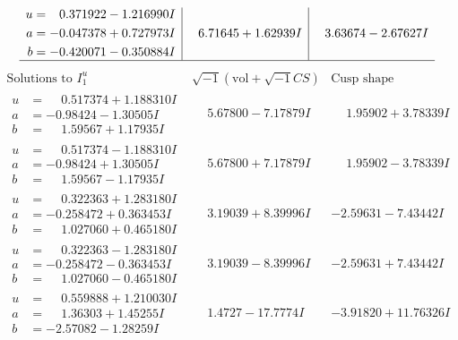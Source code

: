 \documentclass[1p]{elsarticle_modified}
\theoremstyle{definition}
\newcommand{\I}{\sqrt{-1}}
\begin{document}
$$\begin{array}{c|c|c}
\begin{aligned}
u &= \phantom{-}0.371922 - 1.216990 I \\
a &= -0.047378 + 0.727973 I \\
b &= -0.420071 - 0.350884 I\end{aligned}
 & \phantom{-}6.71645 + 1.62939 I & \phantom{-}3.63674 - 2.67627 I\\
 \hline 
 \end{array}$$\newpage$$\begin{array}{c|c|c}  
\text{Solutions to }I^u_{1}& \I (\text{vol} + \sqrt{-1}CS) & \text{Cusp shape}\\
 \hline 
\begin{aligned}
u &= \phantom{-}0.517374 + 1.188310 I \\
a &= -0.98424 - 1.30505 I \\
b &= \phantom{-}1.59567 + 1.17935 I\end{aligned}
 & \phantom{-}5.67800 - 7.17879 I & \phantom{-}1.95902 + 3.78339 I \\ \hline\begin{aligned}
u &= \phantom{-}0.517374 - 1.188310 I \\
a &= -0.98424 + 1.30505 I \\
b &= \phantom{-}1.59567 - 1.17935 I\end{aligned}
 & \phantom{-}5.67800 + 7.17879 I & \phantom{-}1.95902 - 3.78339 I \\ \hline\begin{aligned}
u &= \phantom{-}0.322363 + 1.283180 I \\
a &= -0.258472 + 0.363453 I \\
b &= \phantom{-}1.027060 + 0.465180 I\end{aligned}
 & \phantom{-}3.19039 + 8.39996 I & -2.59631 - 7.43442 I \\ \hline\begin{aligned}
u &= \phantom{-}0.322363 - 1.283180 I \\
a &= -0.258472 - 0.363453 I \\
b &= \phantom{-}1.027060 - 0.465180 I\end{aligned}
 & \phantom{-}3.19039 - 8.39996 I & -2.59631 + 7.43442 I \\ \hline\begin{aligned}
u &= \phantom{-}0.559888 + 1.210030 I \\
a &= \phantom{-}1.36303 + 1.45255 I \\
b &= -2.57082 - 1.28259 I\end{aligned}
 & \phantom{-}1.4727 - 17.7774 I & -3.91820 + 11.76326 I \\ \hline\begin{aligned}

\end{aligned}
\end{array}$$
\end{document}
